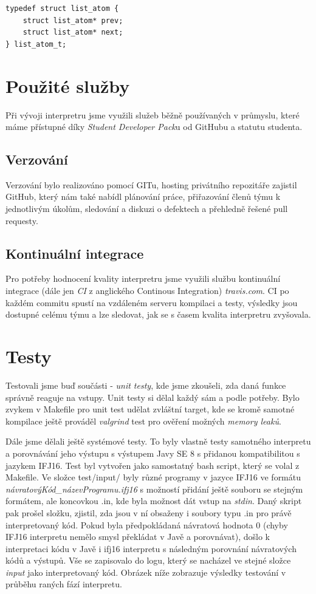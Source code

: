 \documentclass[a4paper,11pt]{article}
\begin{document}
\begin{lstlisting}[caption={Uzel seznamu alokací}, label={lst:gcAllocAtom}]
typedef struct list_atom {
    struct list_atom* prev;
    struct list_atom* next;
} list_atom_t;
\end{lstlisting}

\section{Použité služby}
Při vývoji interpretru jsme využili služeb běžně používaných v průmyslu, které máme přístupné díky \emph{Student Developer Pack}u od GitHubu a statutu studenta.

\subsection{Verzování}
Verzování bylo realizováno pomocí GITu, hosting privátního repozitáře zajistil GitHub, který nám také nabídl plánování práce, přiřazování členů týmu k jednotlivým úkolům, sledování a diskuzi o defektech a přehledně řešené pull requesty.

\subsection{Kontinuální integrace}
Pro potřeby hodnocení kvality interpretru jsme využili službu kontinuální integrace (dále jen \emph{CI} z anglického Continous Integration) \emph{travis.com}. CI po každém commitu spustí na vzdáleném serveru kompilaci a testy, výsledky jsou dostupné celému týmu a lze sledovat, jak se s časem kvalita interpretru zvyšovala.

\section{Testy}
Testovali jsme buď součásti - \textit{unit testy}, kde jsme zkoušeli, zda daná funkce správně reaguje na vstupy. Unit testy si dělal každý sám a podle potřeby. Bylo zvykem v Makefile pro unit test udělat zvláštní target, kde se kromě samotné kompilace ještě prováděl \textit{valgrind} test pro ověření možných \textit{memory leaků}. 

Dále jsme dělali ještě systémové testy. To byly vlastně testy samotného interpretu a porovnávání jeho výstupu s výstupem Javy SE 8 s přidanou kompatibilitou s jazykem IFJ16. Test byl vytvořen jako samostatný bash script, který se volal z Makefile. Ve složce test/input/ byly různé programy v jazyce IFJ16 ve formátu \textit{návratovýKód\_názevProgramu.ifj16} s možností přidání ještě souboru se stejným formátem, ale koncovkou .in, kde byla možnost dát vstup na \textit{stdin}. Daný skript pak prošel složku, zjistil, zda jsou v ní obsaženy i soubory typu .in pro právě interpretovaný kód. Pokud byla předpokládaná návratová hodnota 0 (chyby IFJ16 interpretu nemělo smysl překládat v Javě a porovnávat), došlo k interpretaci kódu v Javě i ifj16 interpretu s následným porovnání návratových kódů a výstupů. Vše se zapisovalo do logu, který se nacházel ve stejné složce \textit{input} jako interpretovaný kód. Obrázek níže zobrazuje výsledky testování v průběhu raných fází interpretu.\\
\end{document}
